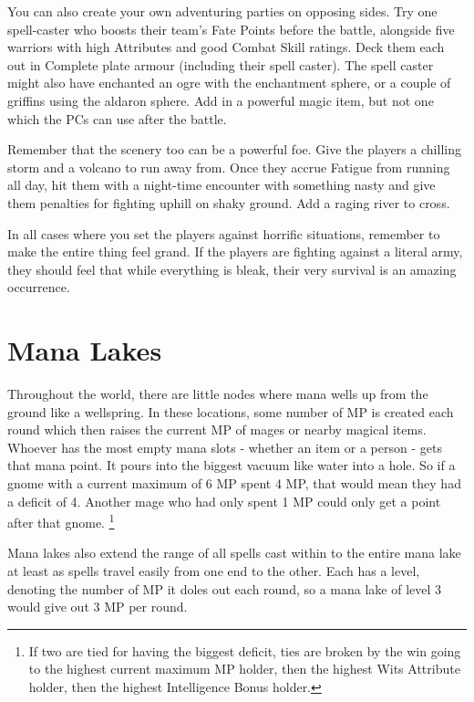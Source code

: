 You can also create your own adventuring parties on opposing sides.  Try one spell-caster who boosts their team's Fate Points before the battle, alongside five warriors with high Attributes and good Combat Skill ratings.  Deck them each out in Complete plate armour (including their spell caster).  The spell caster might also have enchanted an ogre with the enchantment sphere, or a couple  of griffins using the aldaron sphere.  Add in a powerful magic item, but not one which the PCs can use after the battle.

Remember that the scenery too can be a powerful foe.  Give the players a chilling storm and a volcano to run away from.  Once they accrue Fatigue from running all day, hit them with a night-time encounter with something nasty and give them penalties for fighting uphill on shaky ground.  Add a raging river to cross.

In all cases where you set the players against horrific situations, remember to make the entire thing feel grand.  If the players are fighting against a literal army, they should feel that while everything is bleak, their very survival is an amazing occurrence.

\section{Mana Lakes}\label{mana_lake}

Throughout the world, there are little nodes where mana wells up from the ground like a wellspring.  In these locations, some number of MP is created each round which then raises the current MP of mages or nearby magical items.  Whoever has the most empty mana slots - whether an item or a person - gets that mana point.  It pours into the biggest vacuum like water into a hole.  So if a gnome with a current maximum of 6 MP spent 4 MP, that would mean they had a deficit of 4.  Another mage who had only spent 1 MP could only get a point after that gnome. 
\footnote{If two are tied for having the biggest deficit, ties are broken by the win going to the highest current maximum MP holder, then the highest Wits Attribute holder, then the highest Intelligence Bonus holder.}

Mana lakes also extend the range of all spells cast within to the entire mana lake at least as spells travel easily from one end to the other.  Each has a level, denoting the number of MP it doles out each round, so a mana lake of level 3 would give out 3 MP per round.

